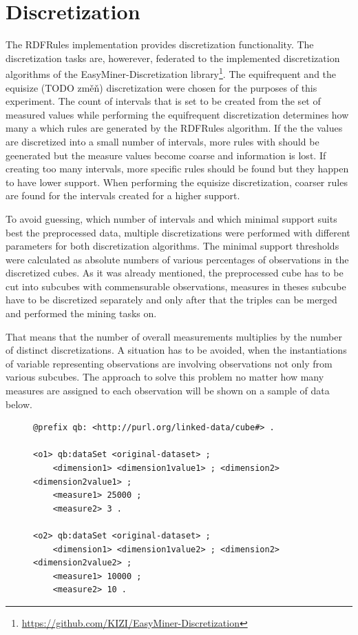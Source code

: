 \section{Discretization\label{discretization}}

The RDFRules implementation provides discretization functionality. The discretization tasks are, howerever, federated to the implemented discretization algorithms of the EasyMiner-Discretization library\footnote{\href{https://github.com/KIZI/EasyMiner-Discretization}{https://github.com/KIZI/EasyMiner-Discretization}}. The equifrequent and the equisize (TODO změň) discretization were chosen for the purposes of this experiment. The count of intervals that is set to be created from the set of measured values while performing the equifrequent discretization determines how many a which rules are generated by the RDFRules algorithm. If the the values are discretized into a small number of intervals, more rules with should be geenerated but the measure values become coarse and information is lost. If creating too many intervals, more specific rules should be found but they happen to have lower support. When performing the equisize discretization, coarser rules are found for the intervals created for a higher support. 

To avoid guessing, which number of intervals and which minimal support suits best the preprocessed data, multiple discretizations were performed with different parameters for both discretization algorithms. The minimal support thresholds were calculated as absolute numbers of various percentages of observations in the discretized cubes. As it was already mentioned, the preprocessed cube has to be cut into subcubes with commensurable observations, measures in theses subcube have to be discretized separately and only after that the triples can be merged and performed the mining tasks on.

That means that the number of overall measurements multiplies by the number of distinct discretizations. A situation has to be avoided, when the instantiations of variable representing observations are involving observations not only from various subcubes. The approach to solve this problem no matter how many measures are assigned to each observation will be shown on a sample of data below.

\begin{figure}[h]
\begin{lstlisting}[language = turtle, caption={Observation example}, label={discsample},captionpos=b escapeinside={(*@}{@*)}]
@prefix qb: <http://purl.org/linked-data/cube#> .

<o1> qb:dataSet <original-dataset> ;
    <dimension1> <dimension1value1> ; <dimension2> <dimension2value1> ;
    <measure1> 25000 ;
    <measure2> 3 .

<o2> qb:dataSet <original-dataset> ;
    <dimension1> <dimension1value2> ; <dimension2> <dimension2value2> ;
    <measure1> 10000 ;
    <measure2> 10 .
 \end{lstlisting}
\end{figure}

